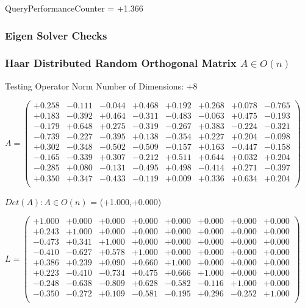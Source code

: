 \documentclass[9pt]{article}
\theoremstyle{plain}
\theoremstyle{definition}
\theoremstyle{remark}
\numberwithin{equation}{section}
\begin{document}
QueryPerformanceCounter  =  +1.366
\subsubsection{Eigen Solver Checks}
\subsubsection{Haar Distributed Random Orthogonal Matrix $A \in O(n)$}
 Testing Operator Norm
Number of Dimensions: +8

$A = \left(
\begin{array}{
cccccccc}
+0.258 & -0.111 & -0.044 & +0.468 & +0.192 & +0.268 & +0.078 & -0.765 \\
+0.183 & -0.392 & +0.464 & -0.311 & -0.483 & -0.063 & +0.475 & -0.193 \\
-0.179 & +0.648 & +0.275 & -0.319 & -0.267 & +0.383 & -0.224 & -0.321 \\
-0.739 & -0.227 & -0.395 & +0.138 & -0.354 & +0.227 & +0.204 & -0.098 \\
+0.302 & -0.348 & -0.502 & -0.509 & -0.157 & +0.163 & -0.447 & -0.158 \\
-0.165 & -0.339 & +0.307 & -0.212 & +0.511 & +0.644 & +0.032 & +0.204 \\
-0.285 & +0.080 & -0.131 & -0.495 & +0.498 & -0.414 & +0.271 & -0.397 \\
+0.350 & +0.347 & -0.433 & -0.119 & +0.009 & +0.336 & +0.634 & +0.204 \\
\end{array}
\right)$ \newline 

$Det(A) :   A \in O(n)$ = (+1.000,+0.000)

$L = \left(
\begin{array}{
cccccccc}
+1.000 & +0.000 & +0.000 & +0.000 & +0.000 & +0.000 & +0.000 & +0.000 \\
+0.243 & +1.000 & +0.000 & +0.000 & +0.000 & +0.000 & +0.000 & +0.000 \\
-0.473 & +0.341 & +1.000 & +0.000 & +0.000 & +0.000 & +0.000 & +0.000 \\
-0.410 & -0.627 & +0.578 & +1.000 & +0.000 & +0.000 & +0.000 & +0.000 \\
+0.386 & +0.239 & +0.090 & +0.660 & +1.000 & +0.000 & +0.000 & +0.000 \\
+0.223 & -0.410 & -0.734 & +0.475 & +0.666 & +1.000 & +0.000 & +0.000 \\
-0.248 & -0.638 & -0.809 & +0.628 & -0.582 & -0.116 & +1.000 & +0.000 \\
-0.350 & -0.272 & +0.109 & -0.581 & -0.195 & +0.296 & -0.252 & +1.000 \\
\end{array}
\right)$ \newline 
\end{document}
